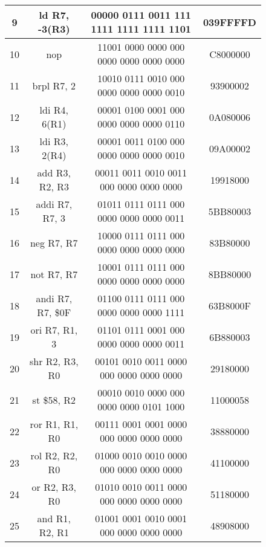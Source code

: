 \documentclass{article}
\begin{document}
\begin{figure}[h!]
\begin{center}
\begin{tabular}{|c|c|c|c|}
                9 & ld R7, -3(R3) & 00000 0111 0011 111 1111 1111 1111 1101 & 039FFFFD \\
                \hline
                10 & nop & 11001 0000 0000 000 0000 0000 0000 0000 & C8000000 \\
                \hline
                11 & brpl R7, 2 & 10010 0111 0010 000 0000 0000 0000 0010 & 93900002 \\
                \hline
                12 & ldi R4, 6(R1) & 00001 0100 0001 000 0000 0000 0000 0110 & 0A080006 \\
                \hline
                13 & ldi R3, 2(R4) & 00001 0011 0100 000 0000 0000 0000 0010 & 09A00002 \\
                \hline
                14 & add R3, R2, R3 & 00011 0011 0010 0011 000 0000 0000 0000 & 19918000 \\
                \hline
                15 & addi R7, R7, 3 & 01011 0111 0111 000 0000 0000 0000 0011 & 5BB80003 \\
                \hline
                16 & neg R7, R7 & 10000 0111 0111 000 0000 0000 0000 0000 & 83B80000 \\
                \hline
                17 & not R7, R7 & 10001 0111 0111 000 0000 0000 0000 0000 & 8BB80000 \\
                \hline
                18 & andi R7, R7, \$0F & 01100 0111 0111 000 0000 0000 0000 1111 & 63B8000F \\
                \hline
                19 & ori R7, R1, 3 & 01101 0111 0001 000 0000 0000 0000 0011 & 6B880003 \\
                \hline
                20 & shr R2, R3, R0 & 00101 0010 0011 0000 000 0000 0000 0000 & 29180000 \\
                \hline
                21 & st \$58, R2 & 00010 0010 0000 000 0000 0000 0101 1000 & 11000058 \\
                \hline
                22 & ror R1, R1, R0 & 00111 0001 0001 0000 000 0000 0000 0000 & 38880000 \\
                \hline
                23 & rol R2, R2, R0 & 01000 0010 0010 0000 000 0000 0000 0000 & 41100000 \\
                \hline 
                24 & or R2, R3, R0 & 01010 0010 0011 0000 000 0000 0000 0000 & 51180000 \\
                \hline
                25 & and R1, R2, R1 & 01001 0001 0010 0001 000 0000 0000 0000 & 48908000 \\
                \hline

\end{tabular}
\end{center}
\end{figure}
\end{document}
